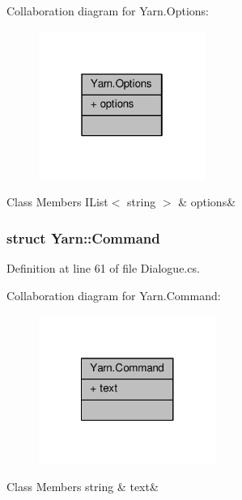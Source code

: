 Collaboration diagram for Yarn.\-Options\-:
\nopagebreak
\begin{figure}[H]
\begin{center}
\leavevmode
\includegraphics[width=154pt]{a00362}
\end{center}
\end{figure}
\begin{DoxyFields}{Class Members}
\hypertarget{a00048_ae8c616d923ceeeed192a9436c55d9917}{I\-List$<$ string $>$}\label{a00048_ae8c616d923ceeeed192a9436c55d9917}
&
options&
\\
\hline

\end{DoxyFields}
\label{a00346}
\hypertarget{a00048_a00346}{}
\subsubsection{struct Yarn\-:\-:Command}


Definition at line 61 of file Dialogue.\-cs.



Collaboration diagram for Yarn.\-Command\-:
\nopagebreak
\begin{figure}[H]
\begin{center}
\leavevmode
\includegraphics[width=164pt]{a00363}
\end{center}
\end{figure}
\begin{DoxyFields}{Class Members}
\hypertarget{a00048_a8564e5104566e145f5d917ec846444d9}{string}\label{a00048_a8564e5104566e145f5d917ec846444d9}
&
text&
\\
\hline

\end{DoxyFields}
\label{a00351}
\hypertarget{a00048_a00351}{}
